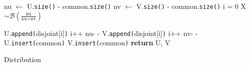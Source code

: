 
\begin{algorithm}[h]
\begin{algorithmic}[1]
	\State nu $\gets$ U.\texttt{size()} - common.\texttt{size()}
	\State nv $\gets$ V.\texttt{size()} - common.\texttt{size()}
	\State i = 0
		\State X $\sim \mathcal{B}(\frac{\text{nu}}{\text{nu}+\text{nv}})$  

			\State U.\texttt{append(}disjoint[i]\texttt{)}
			\State i++
			\State nu- -
		\Else{} 
			\State V.\texttt{append(}disjoint[i]\texttt{)}
			\State i++
			\State nv- -
		\EndIf{}
	\EndWhile{}	
	\State U.\texttt{insert(}common\texttt{)}
	\State V.\texttt{insert(}common\texttt{)}
	\State \textbf{return} U, V
\EndProcedure
\end{algorithmic}
	\caption{Distribution}
\end{algorithm}


